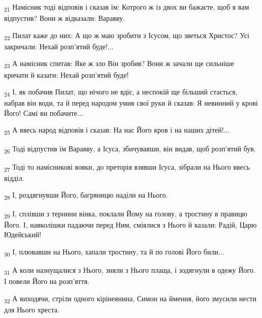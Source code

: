 \begin{tcolorbox}
\textsubscript{21} Намісник тоді відповів і сказав їм: Котрого ж із двох ви бажаєте, щоб я вам відпустив? Вони ж відказали: Варавву.
\end{tcolorbox}
\begin{tcolorbox}
\textsubscript{22} Пилат каже до них: А що ж маю зробити з Ісусом, що зветься Христос? Усі закричали: Нехай розп'ятий буде!...
\end{tcolorbox}
\begin{tcolorbox}
\textsubscript{23} А намісник спитав: Яке ж зло Він зробив? Вони ж зачали ще сильніше кричати й казати: Нехай розп'ятий буде!
\end{tcolorbox}
\begin{tcolorbox}
\textsubscript{24} І, як побачив Пилат, що нічого не вдіє, а неспокій ще більший стається, набрав він води, та й перед народом умив свої руки й сказав: Я невинний у крові Його! Самі ви побачите...
\end{tcolorbox}
\begin{tcolorbox}
\textsubscript{25} А ввесь народ відповів і сказав: На нас Його кров і на наших дітей!...
\end{tcolorbox}
\begin{tcolorbox}
\textsubscript{26} Тоді відпустив їм Варавву, а Ісуса, збичувавши, він видав, щоб розп'ятий був.
\end{tcolorbox}
\begin{tcolorbox}
\textsubscript{27} Тоді то намісникові вояки, до преторія взявши Ісуса, зібрали на Нього ввесь відділ.
\end{tcolorbox}
\begin{tcolorbox}
\textsubscript{28} І, роздягнувши Його, багряницю наділи на Нього.
\end{tcolorbox}
\begin{tcolorbox}
\textsubscript{29} І, сплівши з тернини вінка, поклали Йому на голову, а тростину в правицю Його. І, навколішки падаючи перед Ним, сміялися з Нього й казали: Радій, Царю Юдейський!
\end{tcolorbox}
\begin{tcolorbox}
\textsubscript{30} І, плювавши на Нього, хапали тростину, та й по голові Його били...
\end{tcolorbox}
\begin{tcolorbox}
\textsubscript{31} А коли назнущалися з Нього, зняли з Нього плаща, і зодягнули в одежу Його. І повели Його на розп'яття.
\end{tcolorbox}
\begin{tcolorbox}
\textsubscript{32} А виходячи, стріли одного кірінеянина, Симон на ймення, його змусили нести для Нього хреста.
\end{tcolorbox}
